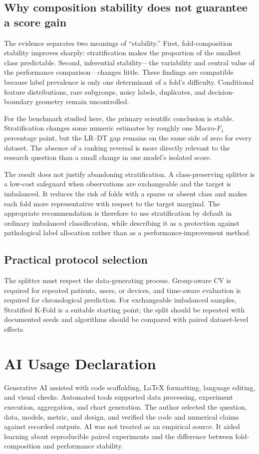 \documentclass[twoside,11pt]{article}
\newcommand{\macrof}{Macro-$F_1$}
\begin{document}
\subsection{Why composition stability does not guarantee a score gain}
The evidence separates two meanings of ``stability.'' First, fold-composition stability improves sharply: stratification makes the proportion of the smallest class predictable. Second, inferential stability---the variability and central value of the performance comparison---changes little. These findings are compatible because label prevalence is only one determinant of a fold's difficulty. Conditional feature distributions, rare subgroups, noisy labels, duplicates, and decision-boundary geometry remain uncontrolled.

For the benchmark studied here, the primary scientific conclusion is stable. Stratification changes some numeric estimates by roughly one \macrof percentage point, but the LR--DT gap remains on the same side of zero for every dataset. The absence of a ranking reversal is more directly relevant to the research question than a small change in one model's isolated score.

The result does not justify abandoning stratification. A class-preserving splitter is a low-cost safeguard when observations are exchangeable and the target is imbalanced. It reduces the risk of folds with a sparse or absent class and makes each fold more representative with respect to the target marginal. The appropriate recommendation is therefore to use stratification by default in ordinary imbalanced classification, while describing it as a protection against pathological label allocation rather than as a performance-improvement method.

\subsection{Practical protocol selection}
The splitter must respect the data-generating process. Group-aware CV is required for repeated patients, users, or devices, and time-aware evaluation is required for chronological prediction. For exchangeable imbalanced samples, Stratified K-Fold is a suitable starting point; the split should be repeated with documented seeds and algorithms should be compared with paired dataset-level effects.

\section{AI Usage Declaration}
Generative AI assisted with code scaffolding, LaTeX formatting, language editing, and visual checks. Automated tools supported data processing, experiment execution, aggregation, and chart generation. The author selected the question, data, models, metric, and design, and verified the code and numerical claims against recorded outputs. AI was not treated as an empirical source. It aided learning about reproducible paired experiments and the difference between fold-composition and performance stability.
\end{document}
